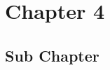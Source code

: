 
\section{Chapter 4}
\label{sec: Chapter 4}
\lipsum[4]

\subsection{Sub Chapter}
\label{sec: sub chapter in chapter 4}
\lipsum[5]


